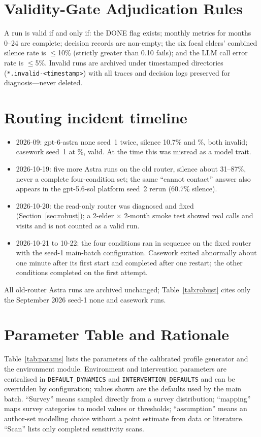 \documentclass[10pt,twocolumn]{article}
\begin{document}
\section{Validity-Gate Adjudication Rules}
A run is valid if and only if: the DONE flag exists; monthly metrics for months 0--24 are complete; decision records are non-empty; the six focal elders' combined silence rate is $\le$10\% (strictly greater than 0.10 fails); and the LLM call error rate is $\le$5\%. Invalid runs are archived under timestamped directories (\texttt{*.invalid-<timestamp>}) with all traces and decision logs preserved for diagnosis---never deleted.

\section{Routing incident timeline}\label{app:router}
\begin{itemize}
\item 2026-09: gpt-6-astra none seed~1 twice, silence 10.7\% and \ArOldSilNone\%, both invalid; casework seed~1 at \ArOldSilCw\%, valid. At the time this was misread as a model trait.
\item 2026-10-19: five more Astra runs on the old router, silence about 31--87\%, never a complete four-condition set; the same ``cannot contact'' answer also appears in the gpt-5.6-sol platform seed~2 rerun (60.7\% silence).
\item 2026-10-20: the read-only router was diagnosed and fixed (Section~\ref{sec:robust}); a 2-elder $\times$ 2-month smoke test showed real calls and visits and is not counted as a valid run.
\item 2026-10-21 to 10-22: the four conditions ran in sequence on the fixed router with the seed-1 main-batch configuration. Casework exited abnormally about one minute after its first start and completed after one restart; the other conditions completed on the first attempt.
\end{itemize}
All old-router Astra runs are archived unchanged; Table~\ref{tab:robust} cites only the September 2026 seed-1 none and casework runs.

\section{Parameter Table and Rationale}\label{app:params}
Table~\ref{tab:params} lists the parameters of the calibrated profile generator and the environment module. Environment and intervention parameters are centralised in \texttt{DEFAULT\_DYNAMICS} and \texttt{INTERVENTION\_DEFAULTS} and can be overridden by configuration; values shown are the defaults used by the main batch. ``Survey'' means sampled directly from a survey distribution; ``mapping'' maps survey categories to model values or thresholds; ``assumption'' means an author-set modelling choice without a point estimate from data or literature. ``Scan'' lists only completed sensitivity scans.
\end{document}
